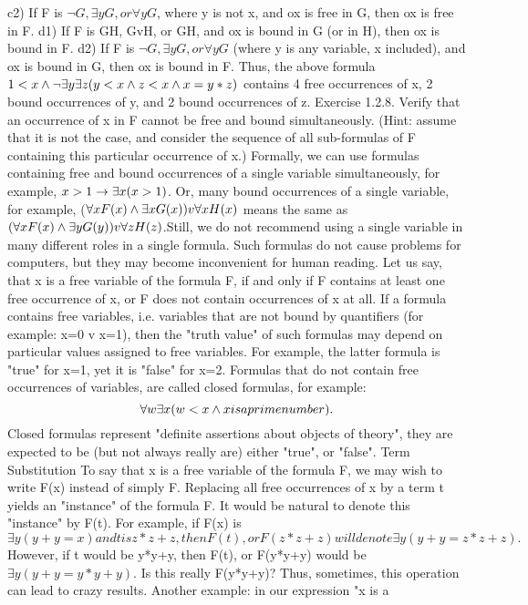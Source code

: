 c2) If F is \(\neg G, \exists yG, or \forall yG\), where y is not x, and ox is free in G, then ox is free in F.
d1) If F is G\AND H, GvH, or G\IMPLIES H, and ox is bound in G (or in H), then ox is bound in F.
d2) If F is \(\neg G, \exists yG, or \forall yG\) (where y is any variable, x included), and ox is bound in G, then ox is bound
in F.
Thus, the above formula \(1<x \wedge  \neg \exists y\exists z(y<x \wedge  z<x \wedge  x=y*z)\) contains 4 free occurrences of x, 2 bound
occurrences of y, and 2 bound occurrences of z.
Exercise 1.2.8. Verify that an occurrence of x in F cannot be free and bound simultaneously. (Hint:
assume that it is not the case, and consider the sequence of all sub-formulas of F containing this particular
occurrence of x.)
Formally, we can use formulas containing free and bound occurrences of a single variable simultaneously,
for example, \(x>1\rightarrow \exists x(x>1)\). Or, many bound occurrences of a single variable, for example, (\(\forall xF(x) \wedge 
\exists xG(x)) v \forall xH(x)\) means the same as \((\forall xF(x) \wedge  \exists yG(y)) v \forall zH(z) \).Still, we do not recommend using a
single variable in many different roles in a single formula. Such formulas do not cause problems for computers, but they may become inconvenient for human reading.
Let us say, that x is a free variable of the formula F, if and only if F contains at least one free occurrence
of x, or F does not contain occurrences of x at all.
If a formula contains free variables, i.e. variables that are not bound by quantifiers (for example: x=0 v
x=1), then the "truth value" of such formulas may depend on particular values assigned to free variables.
For example, the latter formula is "true" for x=1, yet it is "false" for x=2. Formulas that do not contain
free occurrences of variables, are called closed formulas, for example:
\[\forall w\exists x( w<x \wedge  x is a prime number).\]
Closed formulas represent "definite assertions about objects of theory", they are expected to be (but not
always really are) either "true", or "false".
Term Substitution
To say that x is a free variable of the formula F, we may wish to write F(x) instead of simply F. Replacing
all free occurrences of x by a term t yields an "instance" of the formula F. It would be natural to denote
this "instance" by F(t).
For example, if F(x) is \(\exists y(y+y=x) and t is z*z+z, then F(t), or F(z*z+z) will denote \exists y(y+y=z*z+z).\)
However, if t would be y*y+y, then F(t), or F(y*y+y) would be \(\exists y(y+y=y*y+y)\). Is this really F(y*y+y)?
Thus, sometimes, this operation can lead to crazy results. Another example: in our expression "x is a
